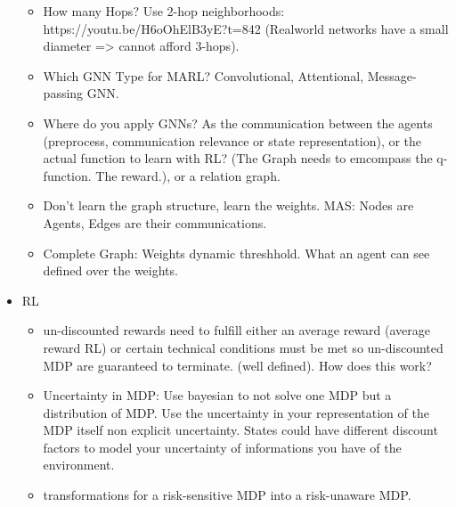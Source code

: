 \begin{itemize}[noitemsep,nolistsep]
	\begin{itemize}[noitemsep,nolistsep]
		\item How many Hops? Use 2-hop neighborhoods: https://youtu.be/H6oOhElB3yE?t=842 (Realworld networks have a small diameter => cannot afford 3-hops).
		\item Which GNN Type for MARL? Convolutional, Attentional, Message-passing GNN.
		\item Where do you apply GNNs? As the communication between the agents (preprocess, communication relevance or state representation), or the actual function to learn with RL? (The Graph needs to emcompass the q-function. The reward.), or a relation graph. 
		\item Don't learn the graph structure, learn the weights. MAS: Nodes are Agents, Edges are their communications.
		\item Complete Graph: Weights dynamic threshhold. What an agent can see defined over the weights.
	\end{itemize}
	\item RL
	\begin{itemize}[noitemsep,nolistsep]
		\item un-discounted rewards need to fulfill either an average reward (average reward RL) or certain technical conditions must be met so un-discounted MDP are guaranteed to terminate. (well defined). How does this work?
		\item Uncertainty in MDP: Use bayesian to not solve one MDP but a distribution of MDP. Use the uncertainty in your representation of the MDP itself non explicit uncertainty. States could have different discount factors to model your uncertainty of informations you have of the environment.
		\item transformations for a risk-sensitive MDP into a risk-unaware MDP.
	\end{itemize}
\end{itemize}



